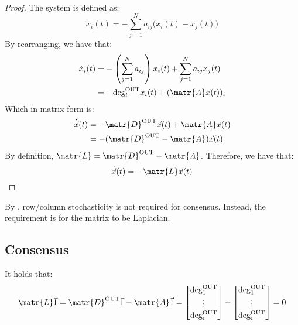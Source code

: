 \begin{description}
\begin{theorem}
            \begin{proof}
                The system is defined as:
                \[
                    \dot{x}_i(t) = - \sum_{j=1}^{N} a_{ij} \Big( x_i(t) - x_j(t) \Big)  
                \]
                By rearranging, we have that:
                \[
                    \begin{split}
                        \dot{x}_i(t) 
                            &= - \left( \sum_{j=1}^{N} a_{ij} \right) x_i(t) + \sum_{j=1}^{N} a_{ij} x_j(t) \\
                            &= -\outdeg[i] x_i(t) + (\matr{A}\vec{x}(t))_i
                    \end{split}
                \]
                Which in matrix form is:
                \[ 
                    \begin{split}
                        \dot{\vec{x}}(t) 
                            &= - \matr{D}^\text{OUT} \vec{x}(t) + \matr{A} \vec{x}(t) \\
                            &= - (\matr{D}^\text{OUT} - \matr{A}) \vec{x}(t) 
                    \end{split}
                \]
                By definition, $\matr{L} = \matr{D}^\text{OUT} - \matr{A}$. Therefore, we have that:
                \[ \dot{\vec{x}}(t) = - \matr{L} \vec{x}(t) \]  
            \end{proof}
        \end{theorem}

        \begin{remark}
            By , row/column stochasticity is not required for consensus. Instead, the requirement is for the matrix to be Laplacian.
        \end{remark}
\end{description}


\subsection{Consensus}

\begin{lemma}
    It holds that:
    \[
        \matr{L}\vec{1} 
        = \matr{D}^\text{OUT} \vec{1} - \matr{A}\vec{1}
        = \begin{bmatrix} \outdeg[1] \\ \vdots \\ \outdeg[i] \end{bmatrix} - \begin{bmatrix} \outdeg[1] \\ \vdots \\ \outdeg[i] \end{bmatrix}
        = 0
    \]
\end{lemma}

